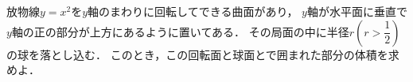 放物線$y=x^2$を$y$軸のまわりに回転してできる曲面があり，
$y$軸が水平面に垂直で$y$軸の正の部分が上方にあるように置いてある．
その局面の中に半径$r \left(r>\dfrac{1}{2}\right)$の球を落とし込む．
このとき，この回転面と球面とで囲まれた部分の体積を求めよ．
